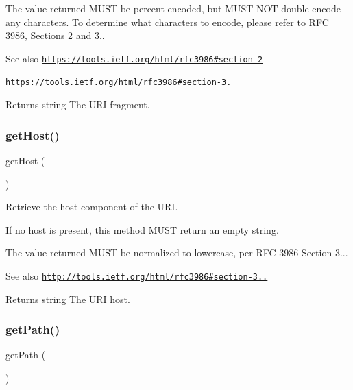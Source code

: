 The value returned M\+U\+ST be percent-\/encoded, but M\+U\+ST N\+OT double-\/encode any characters. To determine what characters to encode, please refer to R\+FC 3986, Sections 2 and 3..

\begin{DoxySeeAlso}{See also}
\href{https://tools.ietf.org/html/rfc3986#section-2}{\tt https\+://tools.\+ietf.\+org/html/rfc3986\#section-\/2} 

\href{https://tools.ietf.org/html/rfc3986#section-3.5}{\tt https\+://tools.\+ietf.\+org/html/rfc3986\#section-\/3.} 
\end{DoxySeeAlso}
\begin{DoxyReturn}{Returns}
string The U\+RI fragment. 
\end{DoxyReturn}
\mbox{\label{class_pes_1_1_http_1_1_uri_a39895a44b52bdced039e698588aaf18e}} 
\subsubsection{\texorpdfstring{get\+Host()}{getHost()}}
{\footnotesize\ttfamily get\+Host (\begin{DoxyParamCaption}{ }\end{DoxyParamCaption})}

Retrieve the host component of the U\+RI.

If no host is present, this method M\+U\+ST return an empty string.

The value returned M\+U\+ST be normalized to lowercase, per R\+FC 3986 Section 3...

\begin{DoxySeeAlso}{See also}
\href{http://tools.ietf.org/html/rfc3986#section-3.2.2}{\tt http\+://tools.\+ietf.\+org/html/rfc3986\#section-\/3..} 
\end{DoxySeeAlso}
\begin{DoxyReturn}{Returns}
string The U\+RI host. 
\end{DoxyReturn}
\mbox{\label{class_pes_1_1_http_1_1_uri_a30c5c67b2bf8e2e2ccc7e361faa20afe}} 
\subsubsection{\texorpdfstring{get\+Path()}{getPath()}}
{\footnotesize\ttfamily get\+Path (\begin{DoxyParamCaption}{ }\end{DoxyParamCaption})}


